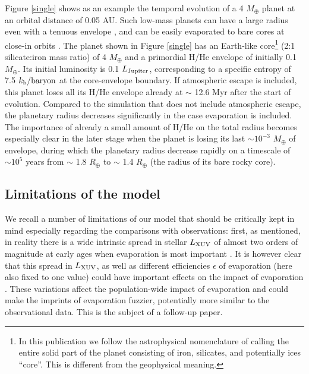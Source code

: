 \documentclass[]{emulateapj}
\def\mearth{M_{\oplus}}
\begin{document}
Figure \ref{single} shows as an example the temporal evolution of a 4 $\mearth$ planet at an orbital distance of 0.05 AU. Such low-mass planets can have a large radius even with a tenuous envelope \citep{Adams2008,Rogers2011,Mordasini2012b}, and can be easily evaporated to bare cores at close-in orbits \citep{Lopez2013,Jin2014}.  The planet shown in Figure \ref{single} has an Earth-like core\footnote{In this publication we follow the astrophysical nomenclature of calling the entire solid part of the planet consisting of iron, silicates, and potentially ices ``core''. This is different from the geophysical meaning.} (2:1 silicate:iron mass ratio) of 4 $M_{\oplus}$ and a primordial H/He envelope of initially 0.1 $M_{\oplus}$. Its initial luminosity is 0.1 $L_{\rm Jupiter}$, corresponding to a specific entropy of 7.5 $k_{\rm b}/{\rm baryon}$ at the core-envelope boundary. If atmospheric escape is included, this planet loses all its H/He envelope already at $\sim$ 12.6 Myr after the start of evolution. Compared to the simulation that does not include atmospheric escape, the planetary radius decreases significantly in the case evaporation is included. The importance of already a small amount of H/He on the total radius becomes especially clear in the later stage when the planet is losing its last $\sim10^{-3}$ $M_{\oplus}$ of envelope, during which the planetary radius decrease rapidly on a timescale of $\sim10^{5}$ years from $\sim$ 1.8 $R_{\oplus}$ to $\sim$ 1.4 $R_{\oplus}$ (the radius of its bare rocky core).

\subsection{{Limitations of the model}}\label{subsect:limitationsmodel}
We recall a number of limitations of our model that should be critically kept in mind especially regarding the comparisons with observations: first, as mentioned, in reality there is a wide intrinsic spread in stellar $L_{\rm XUV}$ of almost two orders of magnitude at early ages when evaporation is most important \citep{Tu2015}. It is however clear that this spread in $L_{\rm XUV}$, as well as different efficiencies $\epsilon$ of evaporation (here also fixed to one value) could have important effects on the impact of evaporation \citep{Tu2015}. {These variations affect the population-wide impact of evaporation and} could make the imprints of evaporation fuzzier, potentially more similar to the observational data. {This is the subject of a follow-up paper.}
\end{document}
